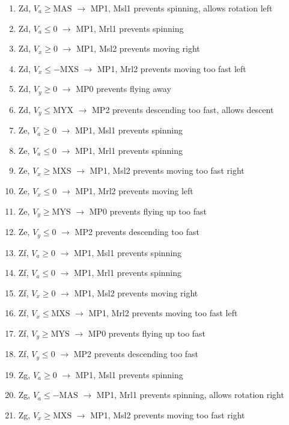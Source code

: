 \documentclass{article}
\begin{document}
\begin{enumerate}
    \item Zd, $V_a \geq \text{MAS}$ $\rightarrow$ MP1, Msl1 \hfill prevents spinning, allows rotation left
    \item Zd, $V_a \leq 0$ $\rightarrow$ MP1, Mrl1 \hfill prevents spinning
    \item Zd, $V_x \geq 0$ $\rightarrow$ MP1, Msl2 \hfill prevents moving right
    \item Zd, $V_x \leq -\text{MXS}$ $\rightarrow$ MP1, Mrl2 \hfill prevents moving too fast left
    \item Zd, $V_y \geq 0$ $\rightarrow$ MP0 \hfill prevents flying away
    \item Zd, $V_y \leq \text{MYX}$ $\rightarrow$ MP2 \hfill prevents descending too fast, allows descent
    \item Ze, $V_a \geq 0$ $\rightarrow$ MP1, Msl1 \hfill prevents spinning
    \item Ze, $V_a \leq 0$ $\rightarrow$ MP1, Mrl1 \hfill prevents spinning
    \item Ze, $V_x \geq \text{MXS}$ $\rightarrow$ MP1, Msl2 \hfill prevents moving too fast right
    \item Ze, $V_x \leq 0$ $\rightarrow$ MP1, Mrl2 \hfill prevents moving left
    \item Ze, $V_y \geq \text{MYS}$ $\rightarrow$ MP0 \hfill prevents flying up too fast
    \item Ze, $V_y \leq 0$ $\rightarrow$ MP2 \hfill prevents descending too fast
    \item Zf, $V_a \geq 0$ $\rightarrow$ MP1, Msl1 \hfill prevents spinning
    \item Zf, $V_a \leq 0$ $\rightarrow$ MP1, Mrl1 \hfill prevents spinning
    \item Zf, $V_x \geq 0$ $\rightarrow$ MP1, Msl2 \hfill prevents moving right
    \item Zf, $V_x \leq \text{MXS}$ $\rightarrow$ MP1, Mrl2 \hfill prevents moving too fast left
    \item Zf, $V_y \geq \text{MYS}$ $\rightarrow$ MP0 \hfill prevents flying up too fast
    \item Zf, $V_y \leq 0$ $\rightarrow$ MP2 \hfill prevents descending too fast
    \item Zg, $V_a \geq 0$ $\rightarrow$ MP1, Msl1 \hfill prevents spinning
    \item Zg, $V_a \leq -\text{MAS}$ $\rightarrow$ MP1, Mrl1 \hfill prevents spinning, allows rotation right
    \item Zg, $V_x \geq \text{MXS}$ $\rightarrow$ MP1, Msl2 \hfill prevents moving too fast right

\end{enumerate}
\end{document}
